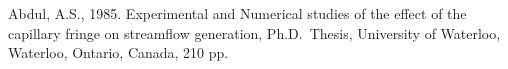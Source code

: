\label{chapter:refs}
\begin{list}{}{
\setlength{\topsep}{0.in} \setlength{\partopsep}{0.in} \setlength{\itemsep}{0.in}
\setlength{\itemindent}{-0.30in}}

\item Abdul, A.S., 1985.  Experimental and Numerical studies of the effect of the capillary fringe
on streamflow generation, Ph.D.\ Thesis, University of Waterloo, Waterloo, Ontario, Canada, 210 pp.

%
%
%
%
%
%
%
%
%
%

\end{list}
